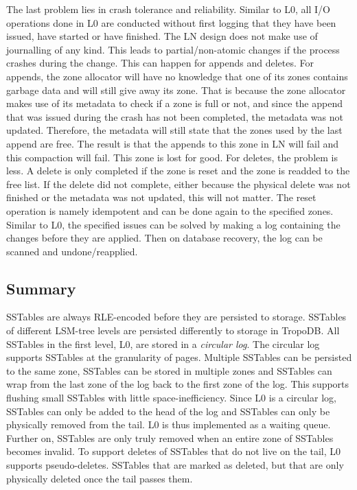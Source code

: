 The last problem lies in crash tolerance and reliability. Similar to L0, all I/O operations done in L0 are conducted without first logging that they have been issued, have started or have finished. The LN design does not make use of journalling of any kind. This leads to partial/non-atomic changes if the process crashes during the change. This can happen for appends and deletes. For appends, the zone allocator will have no knowledge that one of its zones contains garbage data and will still give away its zone. That is because the zone allocator makes use of its metadata to check if a zone is full or not, and since the append that was issued during the crash has not been completed, the metadata was not updated. Therefore, the metadata will still state that the zones used by the last append are free. The result is that the appends to this zone in LN will fail and this compaction will fail. This zone is lost for good. For deletes, the problem is less. A delete is only completed if the zone is reset and the zone is readded to the free list. If the delete did not complete, either because the physical delete was not finished or the metadata was not updated, this will not matter. The reset operation is namely idempotent and can be done again to the specified zones. Similar to L0, the specified issues can be solved by making a log containing the changes before they are applied. Then on database recovery, the log can be scanned and undone/reapplied.

\subsection{Summary}
SSTables are always RLE-encoded before they are persisted to storage. SSTables of different LSM-tree levels are persisted differently to storage in TropoDB. All SSTables in the first level, L0, are stored in a \textit{circular log}. The circular log supports SSTables at the granularity of pages. Multiple SSTables can be persisted to the same zone, SSTables can be stored in multiple zones and SSTables can wrap from the last zone of the log back to the first zone of the log. This supports flushing small SSTables with little space-inefficiency. Since L0 is a circular log, SSTables can only be added to the head of the log and SSTables can only be physically removed from the tail. L0 is thus implemented as a waiting queue. Further on, SSTables are only truly removed when an entire zone of SSTables becomes invalid. To support deletes of SSTables that do not live on the tail, L0 supports pseudo-deletes. SSTables that are marked as deleted, but that are only  physically deleted once the tail passes them.


